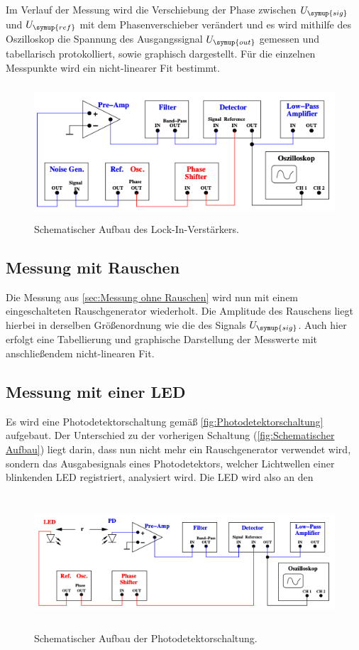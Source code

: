 Im Verlauf der Messung wird die Verschiebung der Phase zwischen $U_{\symup{sig}}$ und $U_{\symup{ref}}$ mit dem Phasenverschieber
verändert und es wird mithilfe des Oszilloskop die Spannung des Ausgangssignal $U_{\symup{out}}$ gemessen und tabellarisch
protokolliert, sowie graphisch dargestellt. Für die einzelnen Messpunkte wird ein nicht-linearer Fit bestimmt.

\begin{figure} [H]
    \centering
    \includegraphics[height=5cm]{content/Bilder/Aufbau_Schema.png}
    \caption{Schematischer Aufbau des Lock-In-Verstärkers.\cite{v303}}
    \label{fig:Schematischer Aufbau}
\end{figure}

\subsection{Messung mit Rauschen}
\label{sec:Messung mit Rauschen}
Die Messung aus \ref{sec:Messung ohne Rauschen} wird nun mit einem eingeschalteten Rauschgenerator wiederholt. Die Amplitude
des Rauschens liegt hierbei in derselben Größenordnung wie die des Signals $U_{\symup{sig}}$.
Auch hier erfolgt eine Tabellierung und graphische Darstellung der Messwerte mit anschließendem nicht-linearen Fit.

\subsection{Messung mit einer LED}
\label{sec:Messung mit einer LED}
Es wird eine Photodetektorschaltung gemäß \autoref{fig:Photodetektorschaltung} aufgebaut. Der Unterschied zu der vorherigen 
Schaltung (\autoref{fig:Schematischer Aufbau}) liegt darin, dass nun nicht mehr ein Rauschgenerator verwendet wird, sondern 
das Ausgabesignals eines Photodetektors, welcher Lichtwellen einer blinkenden LED registriert, analysiert wird. Die LED wird also
an den 

\begin{figure} [H]
    \centering
    \includegraphics[height=5cm]{content/Bilder/Aufbau_led.png}
    \caption{Schematischer Aufbau der Photodetektorschaltung.\cite{v303}}
    \label{fig:Schematischer Aufbau LED}
\end{figure}

